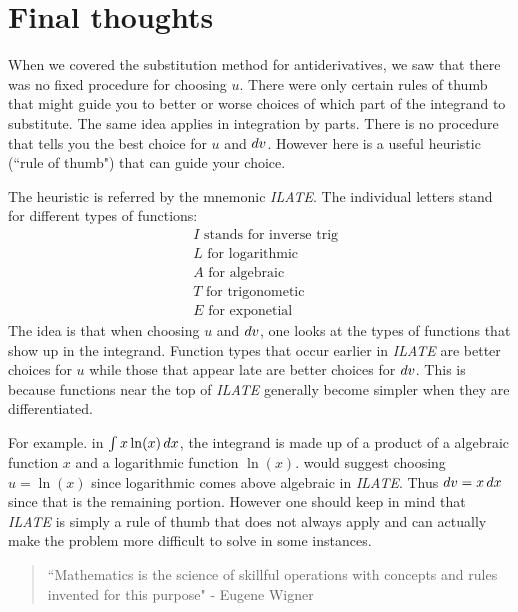 \documentclass{ximera}
\begin{document}
\section{Final thoughts}
When we covered the substitution method for antiderivatives, we saw that there was no fixed procedure for choosing $u$. There were only certain rules of thumb that might guide you to better or worse choices of which part of the integrand to substitute. The same idea applies in integration by parts. There is no procedure that tells you the best choice for $u$ and $\mathop{}\!d v$. However here is a useful heuristic (``rule of thumb") that can guide your choice. 

The heuristic is referred by the mnemonic \textit{ILATE}.  The individual letters stand for different types of functions: 
\begin{align}
&I \text{  stands for inverse trig} \\ 
&L \text{  for logarithmic} \\
&A \text{  for algebraic} \\
&T \text{  for trigonometic} \\
&E \text{  for exponetial}
\end{align}
The idea is that when choosing $u$ and $\mathop{}\!d v$, one looks at the types of functions that show up in the integrand. Function types that occur earlier in \textit{ILATE} are better choices for $u$ while those that appear late are better choices for $\mathop{}\!d v$. This is because functions near the top of  \textit{ILATE} generally become simpler when they are differentiated. 

For example. in $\int x \ln(x) \mathop{}\!d x$, the integrand is made up of a product of a algebraic function $x$ and a logarithmic function $\ln(x)$.    would suggest choosing $u=\ln(x)$ since logarithmic comes above algebraic in \textit{ILATE}. Thus $\mathop{}\!d v=x \mathop{}\!d x$ since that is the remaining portion. However one should keep in mind that \textit{ILATE} is simply a rule of thumb that does not always apply and can actually make the problem more difficult to solve in some instances. 

\begin{quote}
``Mathematics is the science of skillful operations with concepts and rules invented for this purpose" - Eugene Wigner
\end{quote}
\end{document}
